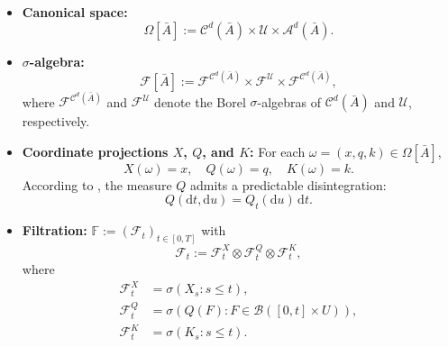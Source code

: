 \documentclass[11pt,amsfonts]{article}
\theoremstyle{plain}
\theoremstyle{assumpstyle}
\numberwithin{equation}{section}
\numberwithin{theorem}{section}
\numberwithin{proposition}{section}
\numberwithin{definition}{section}
\numberwithin{remark}{section}
\numberwithin{corollary}{section}
\numberwithin{lemma}{section}
\begin{document}
\begin{itemize}
    \item \textbf{Canonical space:}
    \begin{equation*}
        \Omega[\bar{A}] := \mathcal{C}^d(\bar{A}) \times \mathcal{U} \times \mathcal{A}^d(\bar{A}).
    \end{equation*}

    \item \textbf{$\sigma$-algebra:}
    \begin{equation*}
        \mathcal{F}[\bar{A}] := \mathcal{F}^{\mathcal{C}^d(\bar{A})} \times \mathcal{F}^{\mathcal{U}} \times \mathcal{F}^{\mathcal{C}^d(\bar{A})},
    \end{equation*}
    where $\mathcal{F}^{\mathcal{C}^d(\bar{A})}$ and $\mathcal{F}^{\mathcal{U}}$ denote the Borel $\sigma$-algebras of $\mathcal{C}^d(\bar{A})$ and $\mathcal{U}$, respectively.

    \item \textbf{Coordinate projections $X$, $Q$, and $K$:} For each $\omega = (x, q, k) \in \Omega[\bar{A}]$,
    \begin{equation*}
        X(\omega) = x, \quad Q(\omega) = q, \quad K(\omega) = k.
    \end{equation*}
    According to \cite[Lemma 3.2]{laker}, the measure $Q$ admits a predictable disintegration:
    \begin{equation*}
        Q(\mathrm{d}t, \mathrm{d}u) = Q_t(\mathrm{d}u) \, \mathrm{d}t.
    \end{equation*}

    \item \textbf{Filtration:} $\mathbb{F} := (\mathcal{F}_t)_{t \in [0,T]}$ with
    \begin{equation*}
        \mathcal{F}_t := \mathcal{F}_t^X \otimes \mathcal{F}_t^Q \otimes \mathcal{F}_t^K,
    \end{equation*}
    where
    \begin{align*}
        \mathcal{F}_t^X &= \sigma(X_s : s \leq t), \\
        \mathcal{F}_t^Q &= \sigma(Q(F) : F \in \mathcal{B}([0,t] \times U)), \\
        \mathcal{F}_t^K &= \sigma(K_s : s \leq t).
    \end{align*}
\end{itemize}
\end{document}
